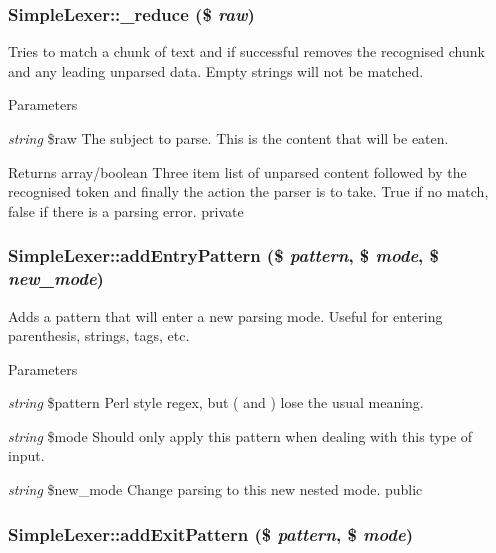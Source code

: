 \hypertarget{class_simple_lexer_a7d11e9e2b45a5b585b57f82e760b5454}{
\subsubsection[{\_\-reduce}]{\setlength{\rightskip}{0pt plus 5cm}SimpleLexer::\_\-reduce (\$ {\em raw})}}
\label{class_simple_lexer_a7d11e9e2b45a5b585b57f82e760b5454}
Tries to match a chunk of text and if successful removes the recognised chunk and any leading unparsed data. Empty strings will not be matched. 
\begin{DoxyParams}{Parameters}
\item[{\em string}]\$raw The subject to parse. This is the content that will be eaten. \end{DoxyParams}
\begin{DoxyReturn}{Returns}
array/boolean Three item list of unparsed content followed by the recognised token and finally the action the parser is to take. True if no match, false if there is a parsing error.  private 
\end{DoxyReturn}
\hypertarget{class_simple_lexer_a4fd4c1124a0c5f7b16548351779deab7}{
\subsubsection[{addEntryPattern}]{\setlength{\rightskip}{0pt plus 5cm}SimpleLexer::addEntryPattern (\$ {\em pattern}, \/  \$ {\em mode}, \/  \$ {\em new\_\-mode})}}
\label{class_simple_lexer_a4fd4c1124a0c5f7b16548351779deab7}
Adds a pattern that will enter a new parsing mode. Useful for entering parenthesis, strings, tags, etc. 
\begin{DoxyParams}{Parameters}
\item[{\em string}]\$pattern Perl style regex, but ( and ) lose the usual meaning. \item[{\em string}]\$mode Should only apply this pattern when dealing with this type of input. \item[{\em string}]\$new\_\-mode Change parsing to this new nested mode.  public \end{DoxyParams}
\hypertarget{class_simple_lexer_a1cf1b9bc0c1d4b8b3dd465e31a6e1a15}{
\subsubsection[{addExitPattern}]{\setlength{\rightskip}{0pt plus 5cm}SimpleLexer::addExitPattern (\$ {\em pattern}, \/  \$ {\em mode})}}

